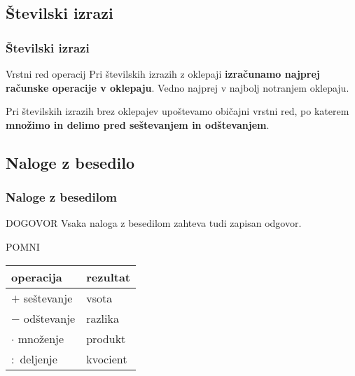     \subsection{Številski izrazi}

        \begin{frame}[t]
            \frametitle{Številski izrazi}

            \begin{alertblock}{Vrstni red operacij}
                Pri številskih izrazih z  oklepaji \textbf{izračunamo najprej računske operacije v oklepaju}. Vedno najprej v najbolj notranjem oklepaju.

                Pri številskih izrazih brez oklepajev upoštevamo običajni vrstni red, po katerem \textbf{množimo in delimo pred seštevanjem in odštevanjem}.
            \end{alertblock}
        \end{frame}

    \subsection{Naloge z besedilo}

        \begin{frame}[t]
            \frametitle{Naloge z besedilom}

            \begin{exampleblock}{DOGOVOR}
                Vsaka naloga z besedilom zahteva tudi zapisan odgovor.
            \end{exampleblock}

            \begin{block}{POMNI}
                \begin{tabular}{|l|l|}
                    \hline 
                    operacija & rezultat \\
                    \hline \hline
                    $+$ seštevanje & vsota \\
                    \hline
                    $-$ odštevanje & razlika \\
                    \hline
                    $\cdot$ množenje & produkt \\
                    \hline
                    $:$ deljenje & kvocient \\
                    \hline 
                    
                \end{tabular}
            \end{block}
        \end{frame}

